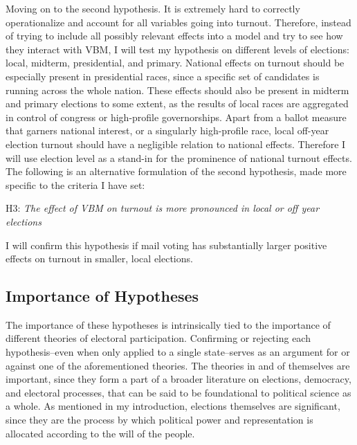 \documentclass[12pt,twoside]{reedthesis}
\begin{document}
  Moving on to the second hypothesis. It is extremely hard to correctly
  operationalize and account for all variables going into turnout.
  Therefore, instead of trying to include all possibly relevant effects
  into a model and try to see how they interact with VBM, I will test my
  hypothesis on different levels of elections: local, midterm,
  presidential, and primary. National effects on turnout should be
  especially present in presidential races, since a specific set of
  candidates is running across the whole nation. These effects should also
  be present in midterm and primary elections to some extent, as the
  results of local races are aggregated in control of congress or
  high-profile governorships. Apart from a ballot measure that garners
  national interest, or a singularly high-profile race, local off-year
  election turnout should have a negligible relation to national effects.
  Therefore I will use election level as a stand-in for the prominence of
  national turnout effects. The following is an alternative formulation of
  the second hypothesis, made more specific to the criteria I have set:
  
  \begin{center}    
  H3: \textit{The  effect  of  VBM  on  turnout  is  more  pronounced  in  local  or  off year elections}
  \end{center}
  
  I will confirm this hypothesis if mail voting has substantially larger
  positive effects on turnout in smaller, local elections.
  
  \subsection{Importance of Hypotheses}\label{importance-of-hypotheses}
  
  The importance of these hypotheses is intrinsically tied to the
  importance of different theories of electoral participation. Confirming
  or rejecting each hypothesis--even when only applied to a single
  state--serves as an argument for or against one of the aforementioned
  theories. The theories in and of themselves are important, since they
  form a part of a broader literature on elections, democracy, and
  electoral processes, that can be said to be foundational to political
  science as a whole. As mentioned in my introduction, elections
  themselves are significant, since they are the process by which
  political power and representation is allocated according to the will of
  the people.
  
\end{document}
